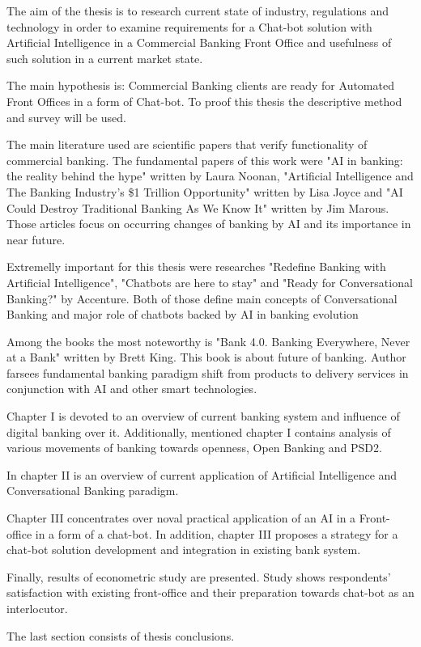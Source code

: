 

The aim of the thesis is to research current state of industry, regulations and technology in order to examine requirements for a Chat-bot solution with Artificial Intelligence in a Commercial Banking Front Office and usefulness of such solution in a current market state.

The main hypothesis is: Commercial Banking clients are ready for Automated Front Offices in a form of Chat-bot.
To proof this thesis the descriptive method and survey will be used.

The main literature used are scientific papers that verify functionality of commercial banking. 
The fundamental papers of this work were "AI in banking: the reality behind the hype" written by Laura Noonan, "Artificial Intelligence and The Banking Industry’s \$1 Trillion Opportunity" written by Lisa Joyce and "AI Could Destroy Traditional Banking As We Know It" written by Jim Marous.
Those articles focus on occurring changes of banking by AI and its importance in near future. 

Extremelly important for this thesis were researches "Redefine Banking with Artificial Intelligence", "Chatbots are here to stay" and "Ready for Conversational Banking?" by Accenture.
Both of those define main concepts of Conversational Banking and major role of chatbots backed by AI in banking evolution 

Among the books the most noteworthy is "Bank 4.0. Banking Everywhere, Never at a Bank" written by Brett King.
This book is about future of banking.
Author farsees fundamental banking paradigm shift from products to delivery services in conjunction with AI and other smart technologies.

Chapter I is devoted to an overview of current banking system and influence of digital banking over it.
Additionally, mentioned chapter I contains analysis of various movements of banking towards openness, Open Banking and PSD2.

In chapter II is an overview of current application of Artificial Intelligence and Conversational Banking paradigm.

Chapter III concentrates over noval practical application of an AI in a Front-office in a form of a chat-bot.
In addition, chapter III proposes a strategy for a chat-bot solution development and integration in existing bank system.

Finally, results of econometric study are presented. 
Study shows respondents' satisfaction with existing front-office and their preparation towards chat-bot as an interlocutor.

The last section consists of thesis conclusions. 
